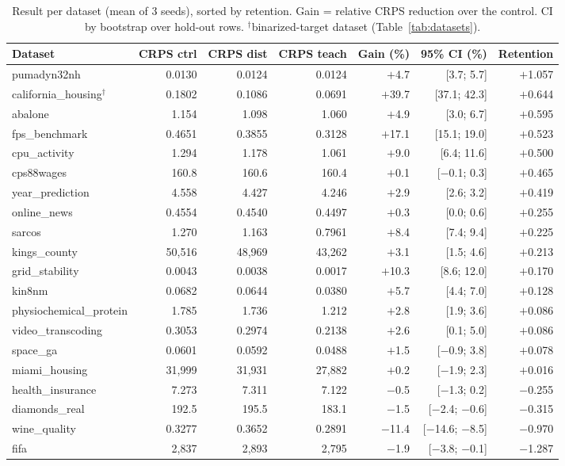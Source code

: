 \begin{table}[htb]
\centering
\caption[Distributional distillation result per dataset]{Result per
dataset (mean of 3 seeds), sorted by retention. Gain = relative CRPS
reduction over the control. CI by bootstrap over hold-out rows.
$^\dagger$binarized-target dataset (Table~\ref{tab:datasets}).}
\label{tab:destil-retencao}
\scriptsize
\setlength{\tabcolsep}{4pt}
\begin{tabular}{lrrrrrr}
\toprule
Dataset & CRPS ctrl & CRPS dist & CRPS teach & Gain (\%) & 95\% CI (\%) & Retention \\
\midrule
pumadyn32nh & 0.0130 & 0.0124 & 0.0124 & $+$4.7 & [3.7; 5.7] & $+$1.057 \\
california\_housing$^\dagger$ & 0.1802 & 0.1086 & 0.0691 & $+$39.7 & [37.1; 42.3] & $+$0.644 \\
abalone & 1.154 & 1.098 & 1.060 & $+$4.9 & [3.0; 6.7] & $+$0.595 \\
fps\_benchmark & 0.4651 & 0.3855 & 0.3128 & $+$17.1 & [15.1; 19.0] & $+$0.523 \\
cpu\_activity & 1.294 & 1.178 & 1.061 & $+$9.0 & [6.4; 11.6] & $+$0.500 \\
cps88wages & 160.8 & 160.6 & 160.4 & $+$0.1 & [$-$0.1; 0.3] & $+$0.465 \\
year\_prediction & 4.558 & 4.427 & 4.246 & $+$2.9 & [2.6; 3.2] & $+$0.419 \\
online\_news & 0.4554 & 0.4540 & 0.4497 & $+$0.3 & [0.0; 0.6] & $+$0.255 \\
sarcos & 1.270 & 1.163 & 0.7961 & $+$8.4 & [7.4; 9.4] & $+$0.225 \\
kings\_county & 50{,}516 & 48{,}969 & 43{,}262 & $+$3.1 & [1.5; 4.6] & $+$0.213 \\
grid\_stability & 0.0043 & 0.0038 & 0.0017 & $+$10.3 & [8.6; 12.0] & $+$0.170 \\
kin8nm & 0.0682 & 0.0644 & 0.0380 & $+$5.7 & [4.4; 7.0] & $+$0.128 \\
physiochemical\_protein & 1.785 & 1.736 & 1.212 & $+$2.8 & [1.9; 3.6] & $+$0.086 \\
video\_transcoding & 0.3053 & 0.2974 & 0.2138 & $+$2.6 & [0.1; 5.0] & $+$0.086 \\
space\_ga & 0.0601 & 0.0592 & 0.0488 & $+$1.5 & [$-$0.9; 3.8] & $+$0.078 \\
miami\_housing & 31{,}999 & 31{,}931 & 27{,}882 & $+$0.2 & [$-$1.9; 2.3] & $+$0.016 \\
health\_insurance & 7.273 & 7.311 & 7.122 & $-$0.5 & [$-$1.3; 0.2] & $-$0.255 \\
diamonds\_real & 192.5 & 195.5 & 183.1 & $-$1.5 & [$-$2.4; $-$0.6] & $-$0.315 \\
wine\_quality & 0.3277 & 0.3652 & 0.2891 & $-$11.4 & [$-$14.6; $-$8.5] & $-$0.970 \\
fifa & 2{,}837 & 2{,}893 & 2{,}795 & $-$1.9 & [$-$3.8; $-$0.1] & $-$1.287 \\
\bottomrule
\end{tabular}
\end{table}

